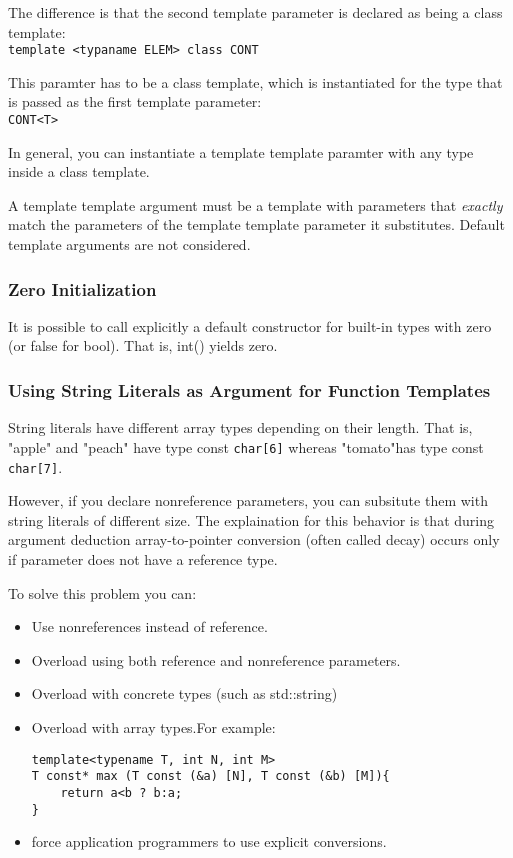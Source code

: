 \documentclass[11pt, a4paper]{book}
\begin{document}
The difference is that the second template parameter is declared as being a class template:\\
\verb|template <typaname ELEM> class CONT|

This paramter has to be a class template, which is instantiated for the type that is passed as the first template parameter:\\
\verb|CONT<T>|

In general, you can instantiate a template template paramter with any type inside a class template.

A template template argument must be a template with parameters that \emph{exactly} match the parameters of the template template parameter it substitutes. Default template arguments are not considered.
\subsubsection{Zero Initialization}
It is possible to call explicitly a default constructor for built-in types with zero (or false for bool). That is, int() yields zero.
\subsubsection{Using String Literals as Argument for Function Templates}
String literals have different array types depending on their length. That is, "apple" and "peach" have type const \verb|char[6]| whereas "tomato"has type const \verb|char[7]|. 

However, if you declare nonreference parameters, you can subsitute them with string literals of different size. The explaination for this behavior is that during argument deduction array-to-pointer conversion (often called decay) occurs only if parameter does not have a reference type.

To solve this problem you can:
\begin{itemize}
\item Use nonreferences instead of reference.
\item Overload using both reference and nonreference parameters.
\item Overload with concrete types (such as std::string)
\item Overload with array types.For example:
\begin{verbatim}
template<typename T, int N, int M>
T const* max (T const (&a) [N], T const (&b) [M]){
    return a<b ? b:a;
}
\end{verbatim}
\item force application programmers to use explicit conversions.
\end{itemize}
\end{document}
